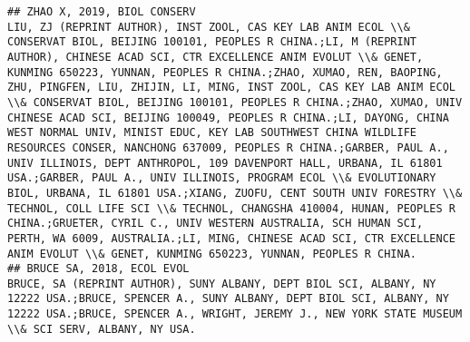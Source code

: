 \documentclass[]{article}
\begin{document}
\begin{verbatim}
## ZHAO X, 2019, BIOL CONSERV                                                                                                                                                                                                                                                                                                                                                         LIU, ZJ (REPRINT AUTHOR), INST ZOOL, CAS KEY LAB ANIM ECOL \\& CONSERVAT BIOL, BEIJING 100101, PEOPLES R CHINA.;LI, M (REPRINT AUTHOR), CHINESE ACAD SCI, CTR EXCELLENCE ANIM EVOLUT \\& GENET, KUNMING 650223, YUNNAN, PEOPLES R CHINA.;ZHAO, XUMAO, REN, BAOPING, ZHU, PINGFEN, LIU, ZHIJIN, LI, MING, INST ZOOL, CAS KEY LAB ANIM ECOL \\& CONSERVAT BIOL, BEIJING 100101, PEOPLES R CHINA.;ZHAO, XUMAO, UNIV CHINESE ACAD SCI, BEIJING 100049, PEOPLES R CHINA.;LI, DAYONG, CHINA WEST NORMAL UNIV, MINIST EDUC, KEY LAB SOUTHWEST CHINA WILDLIFE RESOURCES CONSER, NANCHONG 637009, PEOPLES R CHINA.;GARBER, PAUL A., UNIV ILLINOIS, DEPT ANTHROPOL, 109 DAVENPORT HALL, URBANA, IL 61801 USA.;GARBER, PAUL A., UNIV ILLINOIS, PROGRAM ECOL \\& EVOLUTIONARY BIOL, URBANA, IL 61801 USA.;XIANG, ZUOFU, CENT SOUTH UNIV FORESTRY \\& TECHNOL, COLL LIFE SCI \\& TECHNOL, CHANGSHA 410004, HUNAN, PEOPLES R CHINA.;GRUETER, CYRIL C., UNIV WESTERN AUSTRALIA, SCH HUMAN SCI, PERTH, WA 6009, AUSTRALIA.;LI, MING, CHINESE ACAD SCI, CTR EXCELLENCE ANIM EVOLUT \\& GENET, KUNMING 650223, YUNNAN, PEOPLES R CHINA.
## BRUCE SA, 2018, ECOL EVOL                                                                                                                                                                                                                                                                                                                                                                                                                                                                                                                                                                                                                                                                                                                                                                                                                                                                                                                                                                                                                                                                                                                                                                                                                                   BRUCE, SA (REPRINT AUTHOR), SUNY ALBANY, DEPT BIOL SCI, ALBANY, NY 12222 USA.;BRUCE, SPENCER A., SUNY ALBANY, DEPT BIOL SCI, ALBANY, NY 12222 USA.;BRUCE, SPENCER A., WRIGHT, JEREMY J., NEW YORK STATE MUSEUM \\& SCI SERV, ALBANY, NY USA.

\end{verbatim}
\end{document}
